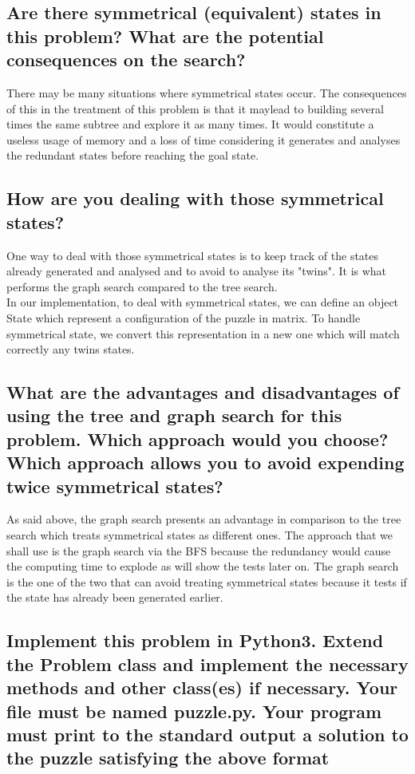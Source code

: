 \documentclass[a4paper,10pt]{article}
\begin{document}
	\subsection{Are there symmetrical (equivalent) states in this problem? What are the potential consequences on the search?}
	
	There may be many situations where symmetrical states occur. The consequences of this in the treatment of this problem is that it maylead to building several times the same subtree and explore it as many times. It would constitute a useless usage of memory and a loss of time considering it generates and analyses the redundant states before reaching the goal state.
	
	\subsection{How are you dealing with those symmetrical states?}
	
	One way to deal with those symmetrical states is to keep track of the states already generated and analysed and to avoid to analyse its "twins". It is what performs the graph search compared to the tree search.\\
	In our implementation, to deal with symmetrical states, we can define an object State which represent a configuration of the puzzle in matrix. To handle symmetrical state, we convert this representation in a new one which will match correctly any twins states.
	\subsection{What are the advantages and disadvantages of using the tree and graph search for this problem. Which approach would you choose? Which approach allows you to avoid expending twice symmetrical states?}

	As said above, the graph search presents an advantage in comparison to the tree search which treats symmetrical states as different ones. The approach that we shall use is the graph search via the BFS because the redundancy would cause the computing time to explode as will show the tests later on.
	The graph search is the one of the two that can avoid treating symmetrical states because it tests if the state has already been generated earlier.
	
	\subsection{Implement this problem in Python3. Extend the Problem class and implement the necessary methods and other class(es) if necessary. Your file must be named puzzle.py. Your program must print to the standard output a solution to the puzzle satisfying the above format}
	
\end{document}
